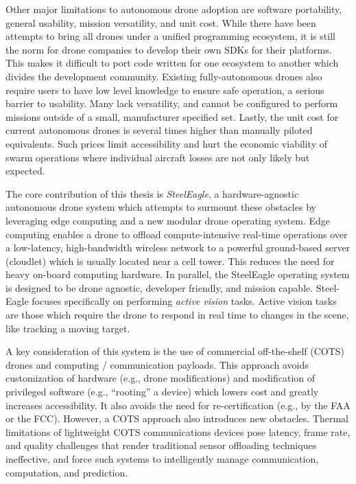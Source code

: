 Other major limitations to autonomous drone adoption are software portability, general usability, mission versatility, and unit cost. While there have been attempts to bring all drones under a unified programming ecosystem, it is still the norm for drone companies to develop their own SDKs for their platforms. This makes it difficult to port code written for one ecosystem to another which divides the development community. Existing fully-autonomous drones also require users to have low level knowledge to ensure safe operation, a serious barrier to usability. Many lack versatility, and cannot be configured to perform missions outside of a small, manufacturer specified set. Lastly, the unit cost for current autonomous drones is several times higher than manually piloted equivalents. Such prices limit accessibility and hurt the economic viability of swarm operations where individual aircraft losses are not only likely but expected.

The core contribution of this thesis is \textit{SteelEagle}, a hardware-agnostic autonomous drone system which attempts to surmount these obstacles by leveraging edge computing and a new modular drone operating system. Edge computing enables a drone to offload compute-intensive real-time operations over a low-latency, high-bandwidth wireless network to a powerful ground-based server (cloudlet) which is usually located near a cell tower. This reduces the need for heavy on-board computing hardware. In parallel, the SteelEagle operating system is designed to be drone agnostic, developer friendly, and mission capable. Steel-Eagle focuses specifically on performing \textit{active vision} tasks. Active vision tasks are those which require the drone to respond in real time to changes in the scene, like tracking a moving target.

A key consideration of this system is the use of commercial off-the-shelf (COTS) drones and computing / communication payloads. This approach avoids customization of hardware (e.g., drone modifications) and modification of privileged software (e.g., “rooting” a device) which lowers cost and greatly increases accessibility. It also avoids the need for re-certification (e.g., by the FAA or the FCC). However, a COTS approach also introduces new obstacles. Thermal limitations of lightweight COTS communications devices pose latency, frame rate, and quality challenges that render traditional sensor offloading techniques ineffective, and force such systems to intelligently manage communication, computation, and prediction.

